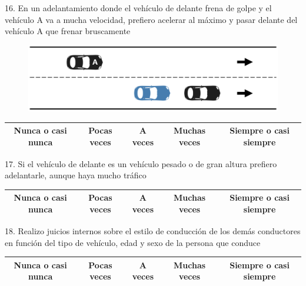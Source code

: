 16. En un adelantamiento donde el vehículo de delante frena de golpe y el vehículo A va a mucha velocidad, prefiero acelerar al máximo y pasar delante del vehículo A que frenar bruscamente
\begin{figure}[h]
    \centering
    \includegraphics[width=14cm]
    {figures/B3.png}
\end{figure}
\vspace{-10pt}
\begin{table}[h]
\centering
\begin{tabular}{|c|c|c|c|c|}
\hline
Nunca o casi nunca & Pocas veces & A veces & Muchas veces & Siempre o casi siempre \\ \hline
\end{tabular}
\end{table}

17. Si el vehículo de delante es un vehículo pesado o de gran altura prefiero adelantarle, aunque haya mucho tráfico
\vspace{-10pt}
\begin{table}[h]
\centering
\begin{tabular}{|c|c|c|c|c|}
\hline
Nunca o casi nunca & Pocas veces & A veces & Muchas veces & Siempre o casi siempre \\ \hline
\end{tabular}
\end{table}

18. Realizo juicios internos sobre el estilo de conducción de los demás conductores en función del tipo de vehículo, edad y sexo de la persona que conduce
\vspace{-10pt}
\begin{table}[H]
\centering
\begin{tabular}{|c|c|c|c|c|}
\hline
Nunca o casi nunca & Pocas veces & A veces & Muchas veces & Siempre o casi siempre \\ \hline
\end{tabular}
\end{table}

